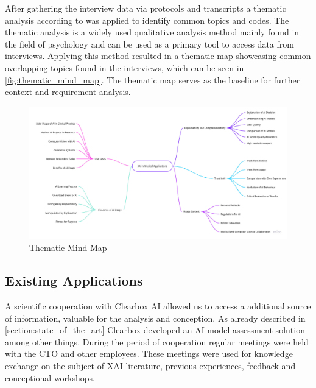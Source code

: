 \documentclass[11pt,a4paper,english]{scrreprt}
\begin{document}
After gathering the interview data via protocols and transcripts a thematic analysis according to \textcite{braun_thematical_2006} was applied to identify common topics and codes. The thematic analysis is a widely used qualitative analysis method mainly found in the field of psychology and can be used as a primary tool to access data from interviews. Applying this method resulted in a thematic map showcasing common overlapping topics found in the interviews, which can be seen in \autoref{fig:thematic_mind_map}. The thematic map serves as the baseline for further context and requirement analysis.

\begin{figure}[htbp]
    \centering
    \includegraphics[height=0.8\textwidth, angle=90]{img/figures/Thematic_Mind_Map.pdf}
    \caption{Thematic Mind Map}
    \label{fig:thematic_mind_map}
\end{figure}

\subsection{Existing Applications}
A scientific cooperation with Clearbox AI allowed us to access a additional source of information, valuable for the analysis and conception. As already described in \autoref{section:state_of_the_art} Clearbox developed an AI model assessment solution among other things. During the period of cooperation regular meetings were held with the CTO and other employees. These meetings were used for knowledge exchange on the subject of XAI literature, previous experiences, feedback and conceptional workshops.
\end{document}
